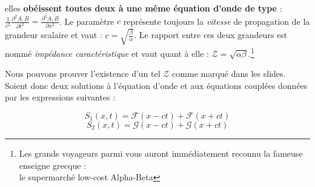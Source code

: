 elles \textbf{obéissent toutes deux à une même équation d'onde de type} : $\frac{1}{c^{2}} \frac{\partial^{2} A,B}{\partial t^{2}} = \frac{\partial^{2} A,B}{\partial x^{2}}$. 
Le paramètre $c$ représente toujours la \textit{vitesse} de propagation de la grandeur scalaire et vaut : $c = \sqrt{\frac{\beta}{\alpha}}$. 
Le rapport entre ces deux grandeurs est nommé \textit{impédance caractéristique} et vaut quant à elle : $\mathcal{Z} = \sqrt{\alpha\beta}$.\footnote{Les grands voyageurs parmi vous auront immédiatement reconnu la fameuse enseigne grecque :\\ le supermarché low-cost Alpha-Beta} 

Nous pouvons prouver l'existence d'un tel $\mathcal{Z}$ comme marqué dans les slides. Soient donc deux solutions à l'équation d'onde et aux équations couplées données par les expressions suivantes :

\[S_{1}(x,t) = \mathcal{F}(x-ct) + \mathcal{F}(x+ct)\]
\[S_{2}(x,t) = \mathcal{G}(x-ct) + \mathcal{G}(x+ct)\]

